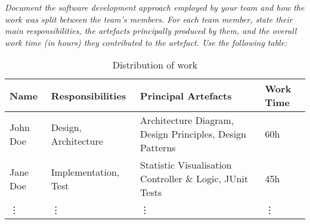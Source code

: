 \emph{Document the software development approach employed by your team and how the work was split between the team's members. For each team member, state their main responsibilities, the artefacts principally produced by them, and the overall work time (in hours) they contributed to the artefact. Use the following table:}

\begin{table}[!h]
  \caption{Distribution of work}
  \centering
  \begin{tabular}{|p{2cm}||p{3cm}|p{5cm}|p{2cm}|}
    \hline
    Name & Responsibilities & Principal Artefacts & Work Time\\
    \hline
    John Doe & Design, Architecture & Architecture Diagram, Design Principles, Design Patterns & 60h\\ \hline
    Jane Doe & Implementation, Test & Statistic Visualisation Controller \& Logic, JUnit Tests & 45h\\ \hline
    \vdots&\vdots&\vdots&\vdots\\
    \hline
  \end{tabular}
\end{table}